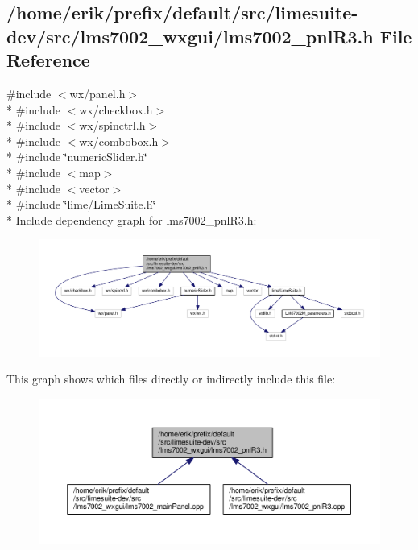 \subsection{/home/erik/prefix/default/src/limesuite-\/dev/src/lms7002\+\_\+wxgui/lms7002\+\_\+pnl\+R3.h File Reference}
\label{lms7002__pnlR3_8h}
{\ttfamily \#include $<$wx/panel.\+h$>$}\\*
{\ttfamily \#include $<$wx/checkbox.\+h$>$}\\*
{\ttfamily \#include $<$wx/spinctrl.\+h$>$}\\*
{\ttfamily \#include $<$wx/combobox.\+h$>$}\\*
{\ttfamily \#include \char`\"{}numeric\+Slider.\+h\char`\"{}}\\*
{\ttfamily \#include $<$map$>$}\\*
{\ttfamily \#include $<$vector$>$}\\*
{\ttfamily \#include \char`\"{}lime/\+Lime\+Suite.\+h\char`\"{}}\\*
Include dependency graph for lms7002\+\_\+pnl\+R3.\+h\+:
\nopagebreak
\begin{figure}[H]
\begin{center}
\leavevmode
\includegraphics[width=350pt]{dc/d6b/lms7002__pnlR3_8h__incl}
\end{center}
\end{figure}
This graph shows which files directly or indirectly include this file\+:
\nopagebreak
\begin{figure}[H]
\begin{center}
\leavevmode
\includegraphics[width=350pt]{d3/d62/lms7002__pnlR3_8h__dep__incl}
\end{center}
\end{figure}
